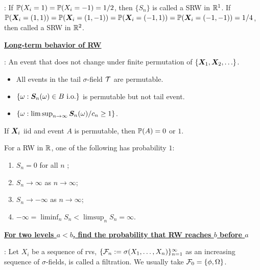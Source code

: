 \documentclass[10pt,a4paper]{article}
\begin{document}
\noindent {}: If $\bbP(X_i=1)=\bbP(X_i=-1)=1/2$, then $\{S_n\}$ is called a SRW in $\bbR^1$. If $\bbP(\X_i=(1,1))=\bbP(\X_i=(1,-1))=\bbP(\X_i=(-1,1))=\bbP(\X_i=(-1,-1))=1/4$, then called a SRW in $\bbR^2$.

\noindent \underline{\textbf{Long-term behavior of RW}}

\noindent {}: An event that does not change under finite permutation of $\{\X_1,\X_2,\ldots\}$.
\begin{itemize}
	\item All events in the tail $\sigma$-field $\calT$ are permutable.
	\item $\{\omega:\S_{n}(\omega)\in B \ \mathrm{i.o.}\}$ is permutable but not tail event. 
	\item $\{\omega:\lim\sup_{n\to\infty}\S_{n}(\omega)/c_{n}\geq1\}$.
\end{itemize}

\begin{thmbox}
\begin{theorem}\label{thm:HS01Law}
	If $\X_i$ iid and event $A$ is permutable, then $\bbP(A)=0$ or $1$.   
\end{theorem}
\end{thmbox}

\begin{thmbox}
	\begin{theorem}\label{thm:longTermRW-1d}
		For a RW in $\bbR$, one of the following has probability $1$:
		\begin{enumerate}[label=(\roman*)]
			\item $S_n=0$ for all $n$ ;
			\item $S_n\to \infty $ as $n\to \infty $;
			\item $S_n\to - \infty $ as $n\to \infty $;
			\item $- \infty = \liminf_{n} S_n < \limsup_n S_n=\infty $.   
		\end{enumerate}  
	\end{theorem}
\end{thmbox}

\noindent \underline{\textbf{For two levels $a<b$, find the probability that RW reaches $b$ before $a$}}

\noindent {}: Let $X_i$ be a sequence of rvs, $\{\calF_n:=\sigma(X_1,\ldots,X_n)\}_{n=1}^\infty $ as an increasing sequence of $\sigma$-fields, is called a filtration. We usually take $\calF_0=\{\phi,\Omega\}$.  
\end{document}
